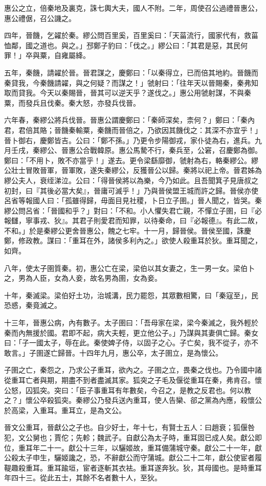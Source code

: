 \begin{pinyinscope}
惠公之立，倍秦地及裏克，誅七輿大夫，國人不附。二年，周使召公過禮晉惠公，惠公禮倨，召公譏之。

四年，晉饑，乞糴於秦。繆公問百里奚，百里奚曰：「天菑流行，國家代有，救菑恤鄰，國之道也。與之。」邳鄭子豹曰：「伐之。」繆公曰：「其君是惡，其民何罪！」卒與粟，自雍屬絳。

五年，秦饑，請糴於晉。晉君謀之，慶鄭曰：「以秦得立，已而倍其地約。晉饑而秦貸我，今秦饑請糴，與之何疑？而謀之！」虢射曰：「往年天以晉賜秦，秦弗知取而貸我。今天以秦賜晉，晉其可以逆天乎？遂伐之。」惠公用虢射謀，不與秦粟，而發兵且伐秦。秦大怒，亦發兵伐晉。

六年春，秦繆公將兵伐晉。晉惠公謂慶鄭曰：「秦師深矣，柰何？」鄭曰：「秦內君，君倍其賂；晉饑秦輸粟，秦饑而晉倍之，乃欲因其饑伐之：其深不亦宜乎！」晉卜御右，慶鄭皆吉。公曰：「鄭不孫。」乃更令步陽御戎，家仆徒為右，進兵。九月壬戌，秦繆公、晉惠公合戰韓原。惠公馬騺不行，秦兵至，公窘，召慶鄭為御。鄭曰：「不用卜，敗不亦當乎！」遂去。更令梁繇靡御，虢射為右，輅秦繆公。繆公壯士冒敗晉軍，晉軍敗，遂失秦繆公，反獲晉公以歸。秦將以祀上帝。晉君姊為繆公夫人，衰绖涕泣。公曰：「得晉侯將以為樂，今乃如此。且吾聞箕子見唐叔之初封，曰『其後必當大矣』，晉庸可滅乎！」乃與晉侯盟王城而許之歸。晉侯亦使呂省等報國人曰：「孤雖得歸，毋面目見社稷，卜日立子圉。」晉人聞之，皆哭。秦繆公問呂省：「晉國和乎？」對曰：「不和。小人懼失君亡親，不憚立子圉，曰『必報讎，寧事戎、狄』。其君子則愛君而知罪，以待秦命，曰『必報德』。有此二故，不和。」於是秦繆公更舍晉惠公，餽之七牢。十一月，歸晉侯。晉侯至國，誅慶鄭，修政教。謀曰：「重耳在外，諸侯多利內之。」欲使人殺重耳於狄。重耳聞之，如齊。

八年，使太子圉質秦。初，惠公亡在梁，梁伯以其女妻之，生一男一女。梁伯卜之，男為人臣，女為人妾，故名男為圉，女為妾。

十年，秦滅梁。梁伯好土功，治城溝，民力罷怨，其眾數相驚，曰「秦寇至」，民恐惑，秦竟滅之。

十三年，晉惠公病，內有數子。太子圉曰：「吾母家在梁，梁今秦滅之，我外輕於秦而內無援於國。君即不起，病大夫輕，更立他公子。」乃謀與其妻俱亡歸。秦女曰：「子一國太子，辱在此。秦使婢子侍，以固子之心。子亡矣，我不從子，亦不敢言。」子圉遂亡歸晉。十四年九月，惠公卒，太子圉立，是為懷公。

子圉之亡，秦怨之，乃求公子重耳，欲內之。子圉之立，畏秦之伐也。乃令國中諸從重耳亡者與期，期盡不到者盡滅其家。狐突之子毛及偃從重耳在秦，弗肯召。懷公怒，囚狐突。突曰：「臣子事重耳有年數矣，今召之，是教之反君也。何以教之？」懷公卒殺狐突。秦繆公乃發兵送內重耳，使人告欒、郤之黨為內應，殺懷公於高梁，入重耳。重耳立，是為文公。

晉文公重耳，晉獻公之子也。自少好士，年十七，有賢士五人：曰趙衰；狐偃咎犯，文公舅也；賈佗；先軫；魏武子。自獻公為太子時，重耳固已成人矣。獻公即位，重耳年二十一。獻公十三年，以驪姬故，重耳備蒲城守秦。獻公二十一年，獻公殺太子申生，驪姬讒之，恐，不辭獻公而守蒲城。獻公二十二年，獻公使宦者履鞮趣殺重耳。重耳踰垣，宦者逐斬其衣袪。重耳遂奔狄。狄，其母國也。是時重耳年四十三。從此五士，其餘不名者數十人，至狄。


\end{pinyinscope}
